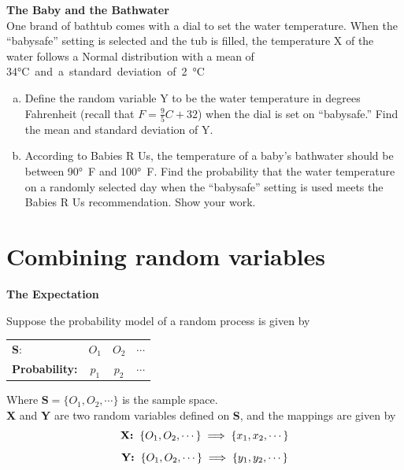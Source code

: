 \documentclass[a4paper, 12pt,twoside]{book}
\begin{document}
\colorbox{champagne}{\parbox{\textwidth}{
\textbf{The Baby and the Bathwater}
\vspace{0.3cm}\\
One brand of bathtub comes with a dial to set the water temperature. When the “babysafe” setting is selected and the tub is filled, the temperature X of the water follows a Normal distribution with a mean of 34\si\degreeCelsius and a standard deviation of 2\si\degreeCelsius . \vspace{0.3cm}\\
  \begin{enumerate}[(a)]
      \item Define the random variable Y to be the water temperature in degrees Fahrenheit  (recall that $F= \frac{9}{5} C+32$) when the dial is set on “babysafe.” Find the mean and standard  deviation of Y. 
      \item According to Babies R Us, the temperature of a baby’s bathwater should be between 90\si{\degree\farad} and 100\si{\degree\farad}. Find the probability that the water temperature on a randomly selected day when the “babysafe” setting is used meets the Babies R Us recommendation. Show your work.
  \end{enumerate}
}}
\newpage

\section{\large{Combining random variables}}
\vspace{0.3cm}    
\textbf{The Expectation}
\vspace{0.3cm}

Suppose the probability model of a random process is given by 
        \begin{table}[H]
        \centering
           \begin{tabular}{lccc}
           \hline
           \textbf{S}:&$O_1$&$O_2$&$\cdots$\\
           \textbf{Probability:}&$p_1$&$p_2$&$\cdots$\\
           \hline
           \end{tabular}
        \end{table}
Where $\textbf{S} = \{O_1, O_2, \cdots\}$ is the sample space.\vspace{0.3cm}\\
\textbf{X} and \textbf{Y} are two random variables defined on \textbf{S}, and the mappings are given by 
$$\textbf{X:}\hspace{0.2cm} \{O_1, O_2, \cdots\} \implies \{x_1, x_2, \cdots\} $$
$$\textbf{Y:}\hspace{0.2cm} \{O_1, O_2, \cdots\} \implies \{y_1, y_2, \cdots\} $$\vspace{0.3cm}
\end{document}
